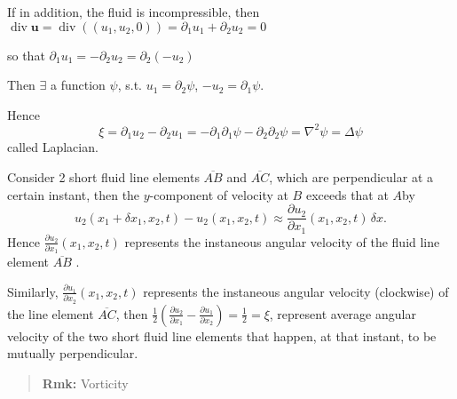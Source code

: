 If in addition, the fluid is incompressible, then $\operatorname{div}\textbf{u} = \operatorname{div}\left((u_1,u_2,0)\right) = \partial_1u_1 + \partial_2 u_2 = 0$

so that $\partial_1u_1 = - \partial_2 u_2 = \partial_2 (-u_2)$​

Then $\exists$ a function $\psi$, s.t. $u_1 = \partial_2\psi$, $- u_2 = \partial_1\psi$.

Hence
\begin{equation}
\xi = \partial_1 u_2- \partial_2 u_1 = - \partial_1\partial_1\psi - \partial_2\partial_2\psi = \nabla^2 \psi= \Delta \psi
\end{equation}
called Laplacian.


Consider 2 short fluid line elements $\overline{AB}$ and $\overline{AC}$, which are perpendicular at a certain instant, then the $y$-component of velocity at $B$ exceeds that at $A$​ by 
\begin{equation}
u_2(x_1+\delta x_1, x_2, t) - u_2(x_1, x_2, t) \approx \frac{\partial u_2}{\partial x_1} (x_1,x_2,t) \, \delta x.
\end{equation}
Hence $\displaystyle \frac{\partial u_2}{\partial x_1}(x_1,x_2,t)$ represents the instaneous angular velocity of the fluid line element $\overline{AB}$ .

Similarly, $\displaystyle \frac{\partial u_1}{\partial x_2}(x_1,x_2,t)$ represents the instaneous angular velocity (clockwise) of the line element $\overline{AC}$, then $\displaystyle \frac{1}{2}\left(\frac{\partial u_2}{\partial x_1} - \frac{\partial u_1}{\partial x_2}\right) = \frac{1}{2} = \xi$, represent average angular velocity of the two short fluid line elements that happen, at that instant, to be mutually perpendicular.

\begin{quote}
	\textbf{Rmk:}
Vorticity
\end{quote}
